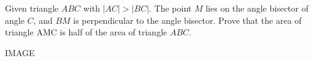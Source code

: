 Given triangle $ABC$ with $|AC| > |BC|$. The point $M$ lies on the angle bisector of angle $C$, and $BM$ is perpendicular to the angle bisector. Prove that the area of triangle AMC is half of the area of triangle $ABC$.

IMAGE

